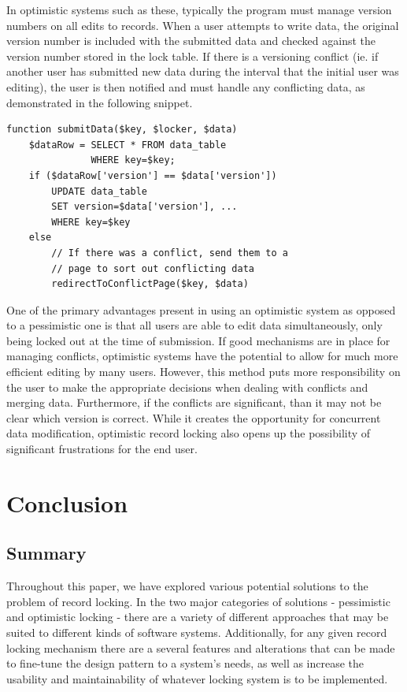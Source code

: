 \documentclass[12pt]{article}
\begin{document}
In optimistic systems such as these, typically the program must manage version numbers on all edits to records. When a user attempts to write data, the original version number is included with the submitted data and checked against the version number stored in the lock table. If there is a versioning conflict (ie. if another user has submitted new data during the interval that the initial user was editing), the user is then notified and must handle any conflicting data, as demonstrated in the following snippet.

\newpage

\begin{framed}
\begin{spacing}{1.0}
\begin{verbatim}
function submitData($key, $locker, $data)
    $dataRow = SELECT * FROM data_table 
               WHERE key=$key;
    if ($dataRow['version'] == $data['version'])
        UPDATE data_table
        SET version=$data['version'], ...
        WHERE key=$key
    else
        // If there was a conflict, send them to a
        // page to sort out conflicting data
        redirectToConflictPage($key, $data)

\end{verbatim}
\end{spacing}
\end{framed}

One of the primary advantages present in using an optimistic system as opposed to a pessimistic one is that all users are able to edit data simultaneously, only being locked out at the time of submission. If good mechanisms are in place for managing conflicts, optimistic systems have the potential to allow for much more efficient editing by many users. However, this method puts more responsibility on the user to make the appropriate decisions when dealing with conflicts and merging data. Furthermore, if the conflicts are significant, than it may not be clear which version is correct. While it creates the opportunity for concurrent data modification, optimistic record locking also opens up the possibility of significant frustrations for the end user.

\newpage
\section{Conclusion}

\subsection{Summary}
Throughout this paper, we have explored various potential solutions to the problem of record locking. In the two major categories of solutions - pessimistic and optimistic locking - there are a variety of different approaches that may be suited to different kinds of software systems. Additionally, for any given record locking mechanism there are a several features and alterations that can be made to fine-tune the design pattern to a system’s needs, as well as increase the usability and maintainability of whatever locking system is to be implemented.
\end{document}

